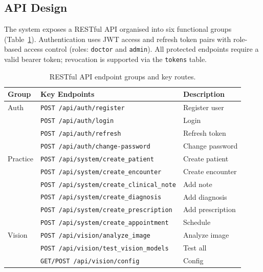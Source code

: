 \documentclass[12pt,a4paper]{report}
\begin{document}
	\subsection*{API Design}
	
	The system exposes a RESTful API organised into six functional groups
	(Table~\ref{tab:api_endpoints}). Authentication uses JWT access and refresh token pairs
	with role-based access control (roles: \texttt{doctor} and \texttt{admin}). All protected
	endpoints require a valid bearer token; revocation is supported via the \texttt{tokens}
	table.
	
		\begin{table}[H]
			\centering
			\footnotesize
			\caption{RESTful API endpoint groups and key routes.}
			\label{tab:api_endpoints}
			\begin{tabularx}{\textwidth}{>{\raggedright\arraybackslash}p{2.2cm} X >{\raggedright\arraybackslash}p{3.8cm}}
				\toprule
				\textbf{Group} & \textbf{Key Endpoints} & \textbf{Description} \\
				\midrule
				Auth
				& \texttt{POST /api/auth/register}       & Register user \\
				& \texttt{POST /api/auth/login}          & Login \\
				& \texttt{POST /api/auth/refresh}        & Refresh token \\
				& \texttt{POST /api/auth/change-password}& Change password \\
				\midrule
				Practice
				& \texttt{POST /api/system/create\_patient}      & Create patient \\
				& \texttt{POST /api/system/create\_encounter}    & Create encounter \\
				& \texttt{POST /api/system/create\_clinical\_note}& Add note \\
				& \texttt{POST /api/system/create\_diagnosis}    & Add diagnosis \\
				& \texttt{POST /api/system/create\_prescription} & Add prescription \\
				& \texttt{POST /api/system/create\_appointment}  & Schedule \\
				\midrule
				Vision
				& \texttt{POST /api/vision/analyze\_image}      & Analyze image \\
				& \texttt{POST /api/vision/test\_vision\_models} & Test all \\
				& \texttt{GET/POST /api/vision/config}          & Config \\

\end{tabularx}
\end{table}
\end{document}
